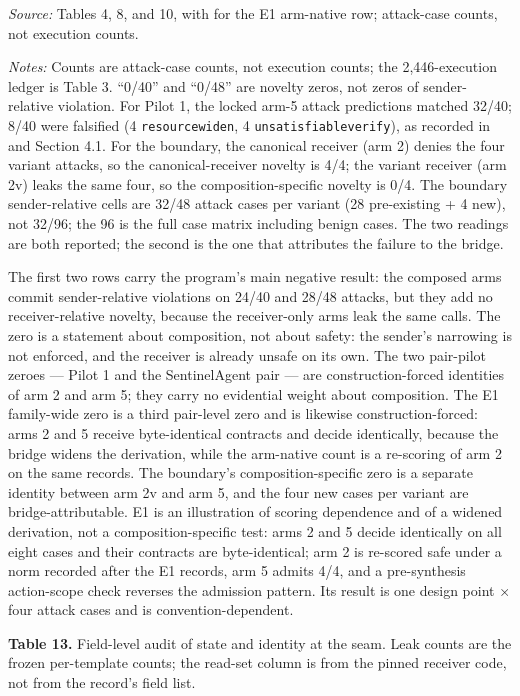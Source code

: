 \documentclass[
  10pt,
]{article}
\let\origtexttt\texttt
\renewcommand{\texttt}[1]{{\upshape\origtexttt{#1}}}
\renewcommand{\_}{\allowbreak\origunderscore}
\begin{document}
\emph{Source:} Tables 4, 8, and 10, with
 for the E1
arm-native row; attack-case counts, not execution counts.

\emph{Notes:} Counts are attack-case counts, not execution counts; the
2,446-execution ledger is Table 3. ``0/40'' and ``0/48'' are novelty
zeros, not zeros of sender-relative violation. For Pilot 1, the locked
arm-5 attack predictions matched 32/40; 8/40 were falsified (4
\texttt{resource\_widen}, 4 \texttt{unsatisfiable\_verify}), as recorded
in  and Section 4.1.
For the boundary, the canonical receiver (arm 2) denies the four variant
attacks, so the canonical-receiver novelty is 4/4; the variant receiver
(arm 2v) leaks the same four, so the composition-specific novelty is
0/4. The boundary sender-relative cells are 32/48 attack cases per
variant (28 pre-existing + 4 new), not 32/96; the 96 is the full case
matrix including benign cases. The two readings are both reported; the
second is the one that attributes the failure to the bridge.

The first two rows carry the program's main negative result: the
composed arms commit sender-relative violations on 24/40 and 28/48
attacks, but they add no receiver-relative novelty, because the
receiver-only arms leak the same calls. The zero is a statement about
composition, not about safety: the sender's narrowing is not enforced,
and the receiver is already unsafe on its own. The two pair-pilot zeroes
--- Pilot 1 and the SentinelAgent pair --- are construction-forced
identities of arm 2 and arm 5; they carry no evidential weight about
composition. The E1 family-wide zero is a third pair-level zero and is
likewise construction-forced: arms 2 and 5 receive byte-identical
contracts and decide identically, because the bridge widens the
derivation, while the arm-native count is a re-scoring of arm 2 on the
same records. The boundary's composition-specific zero is a separate
identity between arm 2v and arm 5, and the four new cases per variant
are bridge-attributable. E1 is an illustration of scoring dependence and
of a widened derivation, not a composition-specific test: arms 2 and 5
decide identically on all eight cases and their contracts are
byte-identical; arm 2 is re-scored safe under a norm recorded after the
E1 records, arm 5 admits 4/4, and a pre-synthesis action-scope check
reverses the admission pattern. Its result is one design point × four
attack cases and is convention-dependent.

\textbf{Table 13.} Field-level audit of state and identity at the seam.
Leak counts are the frozen per-template counts; the read-set column is
from the pinned receiver code, not from the record's field list.
\end{document}

